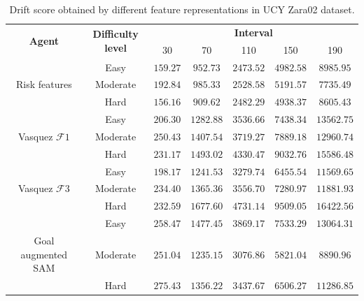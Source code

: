 \begin{table}[htbp]
	\begin{center}
		\renewcommand{\arraystretch}{1.3}
		\begin{tabular}{|c|c|c|c|c|c|c|}
			\hline
			\multicolumn{1}{|c|}{\multirow{2}{*}{\textbf{Agent}}} & \multicolumn{1}{c|}{\multirow{2}{*}{\textbf{Difficulty level}}}  & \multicolumn{5}{c|}{\multirow{1}{*}{\textbf{Interval}}}\\ \cline{3-7}
			
			&& 30 & 70 & 110 & 150  &  190 \\
			\hline
		    & Easy & $159.27$ & $952.73 $ & $2473.52$ & $4982.58$ & $8985.95 $ \\ \cline{2-7}
			Risk features 	& Moderate & $192.84$ & $985.33 $ & $2528.58$ & $5191.57$ & $7735.49 $ \\ \cline{2-7}
			& Hard & $156.16$ & $909.62 $ & $2482.29$ & $4938.37$ & $8605.43 $ \\
			\hline
			& Easy & $206.30$ & $1282.88$ & $3536.66$ & $7438.34 $ & $13562.75$ \\ \cline{2-7}
			Vasquez $\mathcal{F}1$  & Moderate & $250.43$ & $1407.54$ & $3719.27$ & $7889.18$ & $12960.74$ \\ \cline{2-7}
			& Hard & $231.17$ & $1493.02$ & $4330.47$ & $9032.76$ & $15586.48$ \\
			\hline
			& Easy & $198.17$ & $1241.53$ & $3279.74$ & $6455.54$ & $11569.65$ \\ \cline{2-7}
	    	Vasquez $\mathcal{F}3$ 	& Moderate & $234.40$ & $1365.36$ & $3556.70$ & $7280.97$ & $11881.93$ \\ \cline{2-7}
			& Hard & $232.59$ & $1677.60$ & $4731.14$ & $9509.05$ & $16422.56$ \\
			\hline			
			& Easy & $258.47$ & $1477.45$ & $3869.17$ & $7533.29$ & $13064.31$ \\ \cline{2-7}
			Goal augmented SAM  & Moderate & $251.04$ & $1235.15$ & $3076.86$ & $5821.04$ & $8890.96 $ \\ \cline{2-7}
			& Hard & $275.43$ & $1356.22$ & $3437.67$ & $6506.27$ & $11286.85$ \\
			\hline
		\end{tabular}
	\end{center}
	\caption{Drift score obtained by different feature representations in UCY Zara02 dataset.}
	\label{tab:zara02_inter_irl_drift_results}
\end{table}

